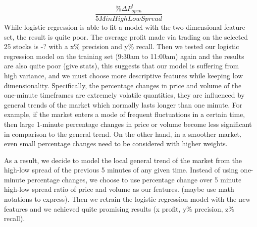 \documentclass[10pt,twocolumn,letterpaper]{article}
\begin{document}
\[\frac{\%\Delta P_{open}^t}{5MinHighLowSpread}\]
While logistic regression is able to fit a model with the two-dimensional feature set, the result is quite poor. The average profit made via trading on the selected 25 stocks is -? with a x\% precision and y\% recall. Then we tested our logistic regression model on the training set (9:30am to 11:00am) again and the results are also quite poor (give stats), this suggests that our model is suffering from high variance, and we must choose more descriptive features while keeping low dimensionality. Specifically, the percentage changes in price and volume of the one-minute timeframes are extremely volatile quantities, they are influenced by general trends of the market which normally lasts longer than one minute. For example, if the market enters a mode of frequent fluctuations in a certain time, then large 1-minute percentage changes in price or volume become less significant in comparison to the general trend. On the other hand, in a smoother market, even small percentage changes need to be considered with higher weights.

As a result, we decide to model the local general trend of the market from the high-low spread of the previous 5 minutes of any given time. Instead of using one-minute percentage changes, we choose to use percentage change over 5 minute high-low spread ratio of price and volume as our features. (maybe use math notations to express). Then we retrain the logistic regression model with the new features and we achieved quite promising results (x profit, y\% precision, z\% recall).
\end{document}
